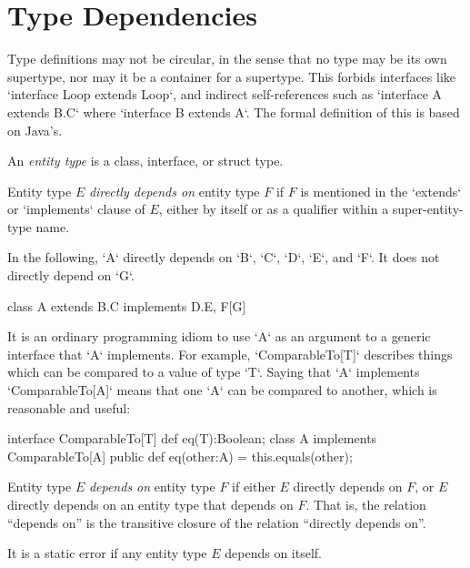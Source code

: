 {\section{Type Dependencies}

Type definitions may not be circular, in the sense that no type may be its own
supertype, nor may it be a container for a supertype. This forbids interfaces
like \xcd`interface Loop extends Loop`, and indirect self-references such as
\xcd`interface A extends B.C` where \xcd`interface B extends A`.  
The formal definition of this is based on Java's.  

An {\em entity type} is a class, interface, or struct type.   

Entity type $E$ {\em directly depends on} entity type $F$ if $F$ is mentioned
in the \xcd`extends` or \xcd`implements` clause of $E$, either by itself or as
a qualifier within a super-entity-type name.  

\begin{ex}
In the following, \xcd`A` directly depends on \xcd`B`, \xcd`C`, \xcd`D`, 
\xcd`E`, and \xcd`F`.    It does not directly depend on \xcd`G`.
\begin{xten}
class A extends B.C implements D.E, F[G] {}
\end{xten}
%

It is an ordinary programming idiom to use \xcd`A` as an argument to a generic
interface that \xcd`A` implements.  For example, \xcd`ComparableTo[T]`
describes things which can be compared to a value of type \xcd`T`. Saying that
\xcd`A` implements \xcd`ComparableTo[A]` means that one \xcd`A` can be
compared to another, which is reasonable and useful: 
\begin{xten}
interface ComparableTo[T] {
  def eq(T):Boolean;
}
class A implements ComparableTo[A] {
  public def eq(other:A) = this.equals(other);
}
\end{xten}
%
\end{ex}

Entity type $E$ {\em depends on} entity type $F$ if
either $E$ directly depends on $F$, or $E$ directly depends on an entity type
that depends on $F$.   That is, the relation ``depends on'' is the transitive
closure of the relation ``directly depends on''.  

It is a static error if any entity type $E$ depends on itself.

}

